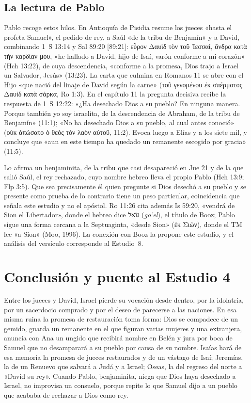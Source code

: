 \documentclass[11pt,letterpaper]{article}
\newcommand{\heb}[1]{\mbox{\foreignlanguage{hebrew}{#1}}}
\newcommand{\grc}[1]{\foreignlanguage{ancientgreek}{#1}}
\begin{document}
\subsection{La lectura de Pablo}
Pablo recoge estos hilos. En Antioquía de Pisidia resume los jueces «hasta el profeta Samuel», el pedido de rey, a Saúl «de la tribu de Benjamín» y a David, combinando 1~S 13:14 y Sal 89:20 [89:21]: \grc{εὗρον Δαυὶδ τὸν τοῦ Ἰεσσαί, ἄνδρα κατὰ τὴν καρδίαν μου}, «he hallado a David, hijo de Isaí, varón conforme a mi corazón» (Hch 13:22), de cuya descendencia, «conforme a la promesa, Dios trajo a Israel un Salvador, Jesús» (13:23). La carta que culmina en Romanos 11 se abre con el Hijo «que nació del linaje de David según la carne» (\grc{τοῦ γενομένου ἐκ σπέρματος Δαυὶδ κατὰ σάρκα}, Ro 1:3). En el capítulo 11 la pregunta decisiva recibe la respuesta de 1~S 12:22: «¿Ha desechado Dios a su pueblo? En ninguna manera. Porque también yo soy israelita, de la descendencia de Abraham, de la tribu de Benjamín» (11:1); «No ha desechado Dios a su pueblo, al cual antes conoció» (\grc{οὐκ ἀπώσατο ὁ θεὸς τὸν λαὸν αὐτοῦ}, 11:2). Evoca luego a Elías y a los siete mil, y concluye que «aun en este tiempo ha quedado un remanente escogido por gracia» (11:5).

Lo afirma un benjaminita, de la tribu que casi desapareció en Jue 21 y de la que salió Saúl, el rey rechazado, cuyo nombre hebreo lleva el propio Pablo (Hch 13:9; Flp 3:5). Que sea precisamente él quien pregunte si Dios desechó a su pueblo y se presente como prueba de lo contrario tiene un peso particular, coincidencia que señala este estudio y no el apóstol. Ro 11:26 cita además Is 59:20, «vendrá de Sion el Libertador», donde el hebreo dice \heb{גּוֹאֵל} (\emph{go'el}), el título de Booz; Pablo sigue una forma cercana a la Septuaginta, «desde Sion» (\grc{ἐκ Σιών}), donde el TM lee «a Sion» (Moo, 1996). La conexión con Booz la propone este estudio, y el análisis del versículo corresponde al Estudio~8.

\section{Conclusión y puente al Estudio 4}

Entre los jueces y David, Israel pierde su vocación desde dentro, por la idolatría, por un sacerdocio comprado y por el deseo de parecerse a las naciones. En esa misma ruina la promesa de restauración toma forma: Dios se compadece de un gemido, guarda un remanente en el que figuran varias mujeres y una extranjera, anuncia con Ana un ungido que recibirá nombre en Belén y jura por boca de Samuel que no desamparará a su pueblo por causa de su nombre. Isaías hará de esa memoria la promesa de jueces restaurados y de un vástago de Isaí; Jeremías, la de un Renuevo que salvará a Judá y a Israel; Oseas, la del regreso del norte a «David su rey». Cuando Pablo, benjaminita, niega que Dios haya desechado a Israel, no improvisa un consuelo, porque repite lo que Samuel dijo a un pueblo que acababa de rechazar a Dios como rey.
\end{document}
